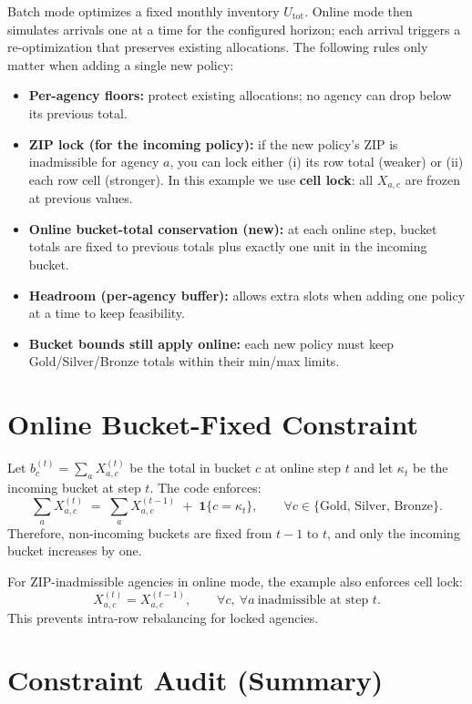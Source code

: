 \documentclass[11pt]{article}
\begin{document}
\noindent
Batch mode optimizes a fixed monthly inventory $U_{\text{tot}}$. Online mode then simulates
arrivals one at a time for the configured horizon; each arrival triggers a
re-optimization that preserves existing allocations. The following rules only matter
when adding a single new policy:

\begin{itemize}
\item \textbf{Per-agency floors:} protect existing allocations; no agency can drop below
its previous total.
\item \textbf{ZIP lock (for the incoming policy):} if the new policy's ZIP is inadmissible
for agency $a$, you can lock either (i) its row total (weaker) or (ii) each row cell
(stronger). In this example we use \textbf{cell lock}: all $X_{a,c}$ are frozen at previous values.
\item \textbf{Online bucket-total conservation (new):} at each online step, bucket totals are
fixed to previous totals plus exactly one unit in the incoming bucket.
\item \textbf{Headroom (per-agency buffer):} allows extra slots when adding one policy at a
time to keep feasibility.
\item \textbf{Bucket bounds still apply online:} each new policy must keep Gold/Silver/Bronze
totals within their min/max limits.
\end{itemize}

\section*{Online Bucket-Fixed Constraint}

\noindent
Let $b^{(t)}_c=\sum_a X^{(t)}_{a,c}$ be the total in bucket $c$ at online step $t$ and let
$\kappa_t$ be the incoming bucket at step $t$. The code enforces:
\[
\sum_a X^{(t)}_{a,c}
\;=\;
\sum_a X^{(t-1)}_{a,c}
\;+\;
\mathbf{1}\{c=\kappa_t\},
\qquad \forall c\in\{\text{Gold, Silver, Bronze}\}.
\]
Therefore, non-incoming buckets are fixed from $t-1$ to $t$, and only the incoming bucket
increases by one.

\noindent
For ZIP-inadmissible agencies in online mode, the example also enforces cell lock:
\[
X^{(t)}_{a,c}=X^{(t-1)}_{a,c},
\qquad \forall c,\ \forall a\ \text{inadmissible at step }t.
\]
This prevents intra-row rebalancing for locked agencies.

\section*{Constraint Audit (Summary)}
\end{document}
